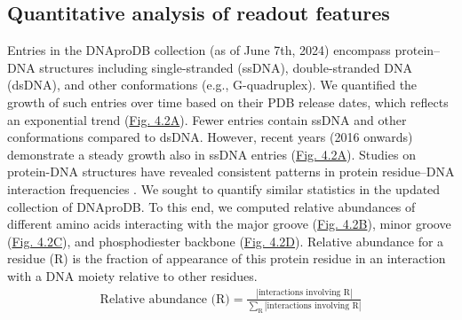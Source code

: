 \subsection{Quantitative analysis of readout features}
Entries in the DNAproDB collection (as of June 7th, 2024) encompass protein–DNA structures including single-stranded (ssDNA), double-stranded DNA (dsDNA), and other conformations (e.g., G-quadruplex). We quantified the growth of such entries over time based on their PDB release dates, which reflects an exponential trend (\hyperref[fig:dnaprodb2]{Fig. 4.2A}). Fewer entries contain ssDNA and other conformations compared to dsDNA. However, recent years (2016 onwards) demonstrate a steady growth also in ssDNA entries (\hyperref[fig:dnaprodb2]{Fig. 4.2A}). 
Studies on protein-DNA structures have revealed consistent patterns in protein residue–DNA interaction frequencies \citep{rohs2009role, Lin2019}. We sought to quantify similar statistics in the updated collection of DNAproDB. To this end, we computed relative abundances of different amino acids interacting with the major groove (\hyperref[fig:dnaprodb2]{Fig. 4.2B}), minor groove (\hyperref[fig:dnaprodb2]{Fig. 4.2C}), and phosphodiester backbone (\hyperref[fig:dnaprodb2]{Fig. 4.2D}). Relative abundance for a residue (R) is the fraction of appearance of this protein residue in an interaction with a DNA moiety relative to other residues. 
\begin{align}
\text{Relative abundance (R)} = \frac{|\text{interactions involving R}|}{\sum\limits_\text{R}|\text{interactions involving R}|}
\end{align}
